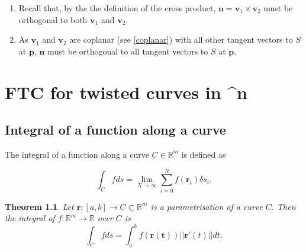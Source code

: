 \documentclass[12pt]{book}
\makeatletter
\newcommand{\rbb}{\mathbb{R}}
\theoremstyle{definitionstyle}
\newtheorem{theorem}[definition]{Theorem}
\renewenvironment{proof}[1][\proofname]{\par
  \pushQED{\qed}%
  \normalfont \topsep6\p@\@plus6\p@\relax
  \trivlist
  \item[\hskip\labelsep
		\bfseries
	#1\@addpunct{.}]\ignorespaces
}{
  \popQED\endtrivlist\@endpefalse
}
\numberwithin{equation}{section}
\makeatother
\begin{document}
\begin{proof}[Proof of Theorem \ref{normal-vector-scalar-value-function} for scalar value functions on $\rbb^2$]
\begin{enumerate}
\begin{equation}
\begin{split}
			\implies \mathbf{n} & = \mathbf{v}_1 \times \mathbf{v}_2
		\end{split}
	    \end{equation}
	\item Recall that, by the the definition of the cross product, $\mathbf{n} = \mathbf{v}_1 \times \mathbf{v}_2$ must be orthogonal to both $\mathbf{v}_1$ and $\mathbf{v}_2$.
	\item As $\mathbf{v}_1$ and $\mathbf{v}_2$ are coplanar (see \ref{coplanar}) with all other tangent vectors to $S$ at $\mathbf{p}$, $\mathbf{n}$ must be orthogonal to all tangent vectors to $S$ at $\mathbf{p}$.
    \end{enumerate}
    
\end{proof}

\newpage

\chapter{FTC for twisted curves in ^n}
\section{Integral of a function along a curve}
The integral of a function along a curve $C \in \mathbb{R}^m$ is defined as

\begin{equation}
    \int_C fds = \lim_{N \to \infty} \sum_{i=0}^N f(\mathbf{r}_i)\delta s_i.
\end{equation}
\begin{theorem}
    Let $\mathbf{r}: [a, b] \to C \subset \mathbb{R}^m$ is a parametrisation of a curve $C$. Then the integral of $f: \mathbb{R}^m \to \mathbb{R}$ over $C$ is
\begin{equation}
    \int_C f ds = \int_{a}^{b} f(\mathbf{r(t)})||\mathbf{r}'(t)||dt.
\end{equation}
\end{theorem}
\end{document}
